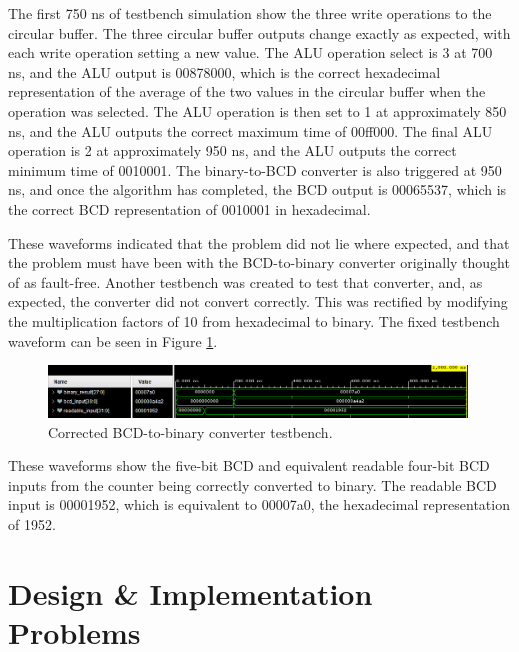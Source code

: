 \documentclass[11pt]{article}
\begin{document}
The first 750 ns of testbench simulation show the three write operations to the circular buffer. The three circular buffer outputs change exactly as expected, with each write operation setting a new value. The ALU operation select is 3 at 700 ns, and the ALU output is 00878000, which is the correct hexadecimal representation of the average of the two values in the circular buffer when the operation was selected. The ALU operation is then set to 1 at approximately 850 ns, and the ALU outputs the correct maximum time of 00ff000. The final ALU operation is 2 at approximately 950 ns, and the ALU outputs the correct minimum time of 0010001. The binary-to-BCD converter is also triggered at 950 ns, and once the algorithm has completed, the BCD output is 00065537, which is the correct BCD representation of 0010001 in hexadecimal.

These waveforms indicated that the problem did not lie where expected, and that the problem must have been with the BCD-to-binary converter originally thought of as fault-free. Another testbench was created to test that converter, and, as expected, the converter did not convert correctly. This was rectified by modifying the multiplication factors of 10 from hexadecimal to binary. The fixed testbench waveform can be seen in Figure \ref{fig:correct_converter_tb}.

\begin{figure}[H]
	\centering
	\includegraphics[width=0.99\textwidth]{WhatsApp Image 2025-05-08 at 16.13.24}
	\caption{Corrected BCD-to-binary converter testbench.}
	\label{fig:correct_converter_tb}
\end{figure}

These waveforms show the five-bit BCD and equivalent readable four-bit BCD inputs from the counter being correctly converted to binary. The readable BCD input is 00001952, which is equivalent to 00007a0, the hexadecimal representation of 1952.

\section{Design \& Implementation Problems}
\end{document}
